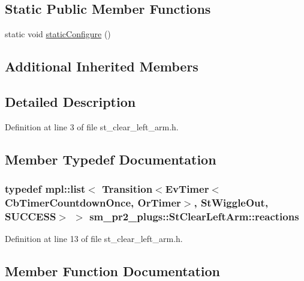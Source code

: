 \subsection*{Static Public Member Functions}
\begin{DoxyCompactItemize}
\item 
static void \hyperlink{structsm__pr2__plugs_1_1StClearLeftArm_a46e6f93715d9c6857c1222616d23c598}{static\+Configure} ()
\end{DoxyCompactItemize}
\subsection*{Additional Inherited Members}


\subsection{Detailed Description}


Definition at line 3 of file st\+\_\+clear\+\_\+left\+\_\+arm.\+h.



\subsection{Member Typedef Documentation}
\subsubsection[{\texorpdfstring{reactions}{reactions}}]{\setlength{\rightskip}{0pt plus 5cm}typedef mpl\+::list$<$ Transition$<$Ev\+Timer$<$Cb\+Timer\+Countdown\+Once, {\bf Or\+Timer}$>$, {\bf St\+Wiggle\+Out}, {\bf S\+U\+C\+C\+E\+SS}$>$ $>$ {\bf sm\+\_\+pr2\+\_\+plugs\+::\+St\+Clear\+Left\+Arm\+::reactions}}\hypertarget{structsm__pr2__plugs_1_1StClearLeftArm_ad3ce24ba9cd08d5c1ec12e041b3af125}{}\label{structsm__pr2__plugs_1_1StClearLeftArm_ad3ce24ba9cd08d5c1ec12e041b3af125}


Definition at line 13 of file st\+\_\+clear\+\_\+left\+\_\+arm.\+h.



\subsection{Member Function Documentation}
